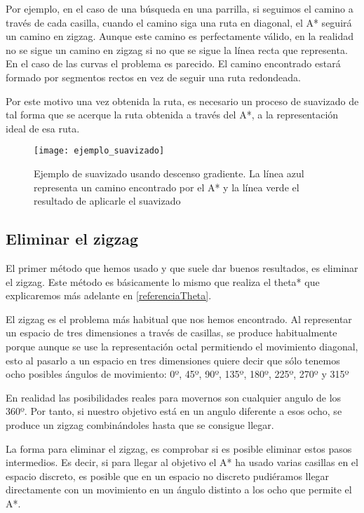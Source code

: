 Por ejemplo, en el caso de una búsqueda en una parrilla, si seguimos el camino a través de cada casilla, cuando el camino siga una ruta en diagonal, el A* seguirá un camino en zigzag. Aunque este camino es perfectamente válido, en la realidad no se sigue un camino en zigzag si no que se sigue la línea recta que representa. En el caso de las curvas el problema es parecido. El camino encontrado estará formado por segmentos rectos en vez de seguir una ruta redondeada.

Por este motivo una vez obtenida la ruta, es necesario un proceso de suavizado de tal forma que se acerque la ruta obtenida a través del A*, a la representación ideal de esa ruta.

\begin{figure}[htpb]
    \centering
    \texttt{[image: ejemplo\_suavizado]}
    \caption[Ejemplo de suavizado usando descenso gradiente]{Ejemplo de suavizado usando descenso gradiente. La línea azul representa un camino encontrado por el A* y la línea verde el resultado de aplicarle el suavizado}
    \label{fig:basics AFM sketch}
\end{figure}

\subsection{Eliminar el zigzag}

El primer método que hemos usado y que suele dar buenos resultados, es eliminar el zigzag. Este método es básicamente lo mismo que realiza el theta* que explicaremos más adelante en \ref{referenciaTheta}.

El zigzag es el problema más habitual que nos hemos encontrado. Al representar un espacio de tres dimensiones a través de casillas, se produce habitualmente porque aunque se use la representación octal permitiendo el movimiento diagonal, esto al pasarlo a un espacio en tres dimensiones quiere decir que sólo tenemos ocho posibles ángulos de movimiento: 0º, 45º, 90º, 135º, 180º, 225º, 270º y 315º

En realidad las posibilidades reales para movernos son cualquier angulo de los 360º. Por tanto, si nuestro objetivo está en un angulo diferente a esos ocho, se produce un zigzag combinándoles hasta que se consigue llegar.

La forma para eliminar el zigzag, es comprobar si es posible eliminar estos pasos intermedios. Es decir, si para llegar al objetivo el A* ha usado varias casillas en el espacio discreto, es posible que en un espacio no discreto pudiéramos llegar directamente con un movimiento en un ángulo distinto a los ocho que permite el A*.


